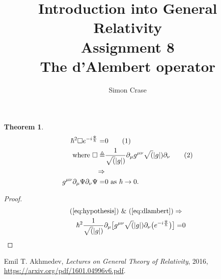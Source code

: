 \documentclass[]{article}
\title{Introduction into General Relativity\\Assignment 8\\The d'Alembert operator}
\author{Simon Crase}
\newtheorem{theorem}{Theorem}
\newcommand\numberthis{\addtocounter{equation}{1}\tag{\theequation}}
\begin{document}
\maketitle


\begin{theorem}
\begin{align*}
	\hbar^2 \Box e^{-i\frac{\Psi}{\hbar}}=&0 \numberthis \label{eq:hypothesis}\\ \text{ where } \Box \triangleq& \frac{1}{\sqrt(|g|)} \partial_{\mu} g^{\mu\nu}\sqrt(|g|)\partial_{\nu}\numberthis\label{eq:dlambert}\\ \Rightarrow&\\ g^{\mu\nu}\partial_{\mu}\Psi \partial_{\nu}\Psi=&0 \text{ as }\hbar \rightarrow 0.
\end{align*}
\end{theorem}

\begin{proof}
\begin{align*}
	\text{(\ref{eq:hypothesis}) \& (\ref{eq:dlambert})} \Rightarrow&\\
	\hbar^2 \frac{1}{\sqrt(|g|)} \partial_{\mu}\big[ g^{\mu\nu}\sqrt(|g|)\partial_{\nu}\big(e^{-i\frac{\Psi}{\hbar}}\big)\big]=&0
\end{align*}	

\end{proof}

\begin{thebibliography}{9}
	
	Emil T. Akhmedev,
	\emph{Lectures on General Theory of Relativity},
	2016,
	\url{https://arxiv.org/pdf/1601.04996v6.pdf}.
	

\end{thebibliography}
\end{document}

